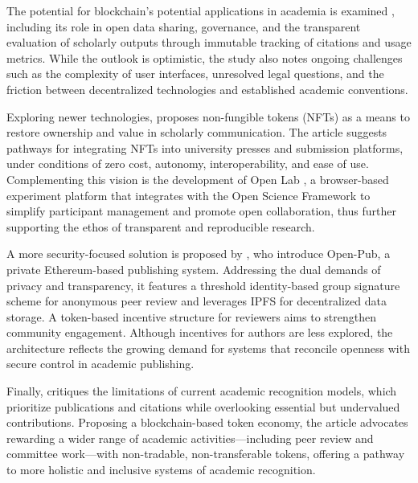 \documentclass{article}
\begin{document}
The potential for blockchain’s potential applications in academia is examined \cite{kosmarski_blockchain_2020}, including its role in open data sharing, governance, and the transparent evaluation of scholarly outputs through immutable tracking of citations and usage metrics. While the outlook is optimistic, the study also notes ongoing challenges such as the complexity of user interfaces, unresolved legal questions, and the friction between decentralized technologies and established academic conventions.

Exploring newer technologies, \cite{putnings_non-fungible_2022} proposes non-fungible tokens (NFTs) as a means to restore ownership and value in scholarly communication. The article suggests pathways for integrating NFTs into university presses and submission platforms, under conditions of zero cost, autonomy, interoperability, and ease of use. Complementing this vision is the development of Open Lab \cite{shevchenko_open_2022}, a browser-based experiment platform that integrates with the Open Science Framework to simplify participant management and promote open collaboration, thus further supporting the ethos of transparent and reproducible research.

A more security-focused solution is proposed by \cite{zhou_open-pub_2021}, who introduce Open-Pub, a private Ethereum-based publishing system. Addressing the dual demands of privacy and transparency, it features a threshold identity-based group signature scheme for anonymous peer review and leverages IPFS for decentralized data storage. A token-based incentive structure for reviewers aims to strengthen community engagement. Although incentives for authors are less explored, the architecture reflects the growing demand for systems that reconcile openness with secure control in academic publishing.

Finally, \cite{lee_unblocking_2023} critiques the limitations of current academic recognition models, which prioritize publications and citations while overlooking essential but undervalued contributions. Proposing a blockchain-based token economy, the article advocates rewarding a wider range of academic activities—including peer review and committee work—with non-tradable, non-transferable tokens, offering a pathway to more holistic and inclusive systems of academic recognition.

\end{document}
